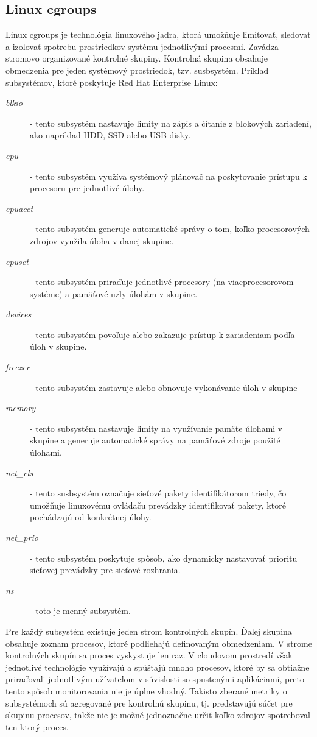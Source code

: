 \documentclass[printed,11pt,twoside,color,cover,table]{fithesis3}
\begin{document}
\subsection{Linux cgroups}
Linux cgroups je technológia linuxového jadra, ktorá umožňuje limitovať, sledovať a izolovať spotrebu prostriedkov systému jednotlivými procesmi. Zavádza stromovo organizované kontrolné skupiny. 
Kontrolná skupina obsahuje obmedzenia pre jeden systémový prostriedok, tzv. susbsystém. Príklad subsystémov, ktoré poskytuje Red Hat Enterprise Linux: 
\begin{description}
\item[\emph{blkio}] - tento subsystém nastavuje limity na zápis a čítanie z blokových zariadení, ako napríklad HDD, SSD alebo USB disky.
\item[\emph{cpu}] - tento subsystém využíva systémový plánovač na poskytovanie prístupu k procesoru pre jednotlivé úlohy.
\item[\emph{cpuacct}] - tento subsystém generuje automatické správy o tom, koľko procesorových zdrojov využila úloha v danej skupine.
\item[\emph{cpuset}] - tento subsystém priraďuje jednotlivé procesory (na viacprocesorovom systéme) a pamäťové uzly úlohám v skupine.
\item[\emph{devices}] - tento subsystém povoľuje alebo zakazuje prístup k zariadeniam podľa úloh v skupine.
\item[\emph{freezer}] - tento subsystém zastavuje alebo obnovuje vykonávanie úloh v skupine
\item[\emph{memory}] - tento subsystém nastavuje limity na využívanie pamäte úlohami v skupine a generuje automatické správy na pamäťové zdroje použité úlohami.
\item[\emph{net\_cls}] - tento susbsystém označuje sieťové pakety identifikátorom triedy, čo umožňuje linuxovému ovládaču prevádzky identifikovať pakety, ktoré pochádzajú od konkrétnej úlohy.
\item[\emph{net\_prio}] - tento subsystém poskytuje spôsob, ako dynamicky nastavovať prioritu sieťovej prevádzky pre sieťové rozhrania.
\item[\emph{ns}] - toto je menný subsystém.
\end{description}
\cite{cgroups}

Pre každý subsystém existuje jeden strom kontrolných skupín. Ďalej skupina obsahuje zoznam procesov, ktoré podliehajú definovaným obmedzeniam. V strome kontrolných skupín sa proces vyskystuje len raz.
V cloudovom prostredí však jednotlivé technológie využívajú a spúšťajú mnoho procesov, ktoré by sa obtiažne priraďovali jednotlivým užívateľom v súvislosti so spustenými aplikáciami, preto tento spôsob
monitorovania nie je úplne vhodný. Takisto zberané metriky o subsystémoch sú agregované pre kontrolnú skupinu, tj. predstavujú súčet pre skupinu procesov, takže nie je možné jednoznačne určiť koľko zdrojov spotreboval
ten ktorý proces.
\end{document}
